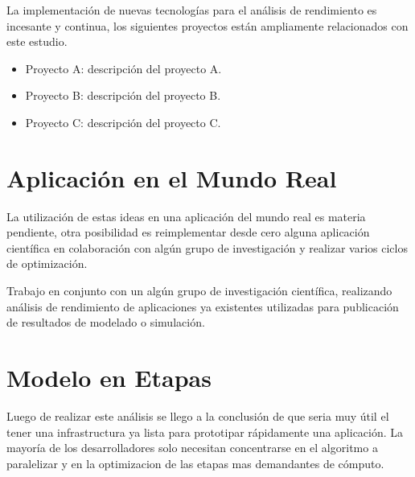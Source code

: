 \documentclass[a4paper]{report}
\begin{document}
La implementaci\'on de nuevas tecnolog\'ias para el an\'alisis de rendimiento
es incesante y continua, los siguientes proyectos est\'an ampliamente
relacionados con este estudio.

\begin{itemize}
\item Proyecto A: descripci\'on del proyecto A.
\item Proyecto B: descripci\'on del proyecto B.
\item Proyecto C: descripci\'on del proyecto C.
\end{itemize}

\section{Aplicaci\'on en el Mundo Real}

La utilizaci\'on de estas ideas en una aplicaci\'on del mundo real es materia
pendiente, otra posibilidad es reimplementar desde cero alguna aplicaci\'on
cient\'ifica en colaboraci\'on con alg\'un grupo de investigaci\'on y realizar
varios ciclos de optimizaci\'on.

\bigskip

Trabajo en conjunto con un alg\'un grupo de investigaci\'on cient\'ifica,
realizando an\'alisis de rendimiento de aplicaciones ya existentes utilizadas
para publicaci\'on de resultados de modelado o simulaci\'on.

\section{Modelo en Etapas}

Luego de realizar este an\'alisis se llego a la conclusi\'on de que seria muy \'util
el tener una infrastructura ya lista para prototipar r\'apidamente una aplicaci\'on.
La mayor\'ia de los desarrolladores solo necesitan concentrarse en el algoritmo a
paralelizar y en la optimizacion de las etapas mas demandantes de c\'omputo.
\end{document}
